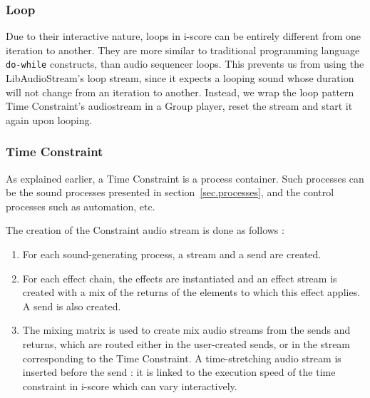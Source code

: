 \documentclass{article}
\begin{document}
\subsubsection{Loop}
Due to their interactive nature, loops in i-score can be entirely different from 
one iteration to another. 
They are more similar to traditional programming language \texttt{do-while} constructs, than audio sequencer loops.
This prevents us from using the LibAudioStream's loop stream, since 
it expects a looping sound whose duration will not change from an iteration to another.
Instead, we wrap the loop pattern Time Constraint's audiostream in a Group player, reset the stream and start it again upon looping.

\subsubsection{Time Constraint}
As explained earlier, a Time Constraint is a process container.
Such processes can be the sound processes presented in section~\ref{sec.processes}, and 
the control processes such as automation, etc.

The creation of the Constraint audio stream is done as follows : 
\begin{enumerate}
    \item For each sound-generating process, a stream and a send are created.
    \item For each effect chain, the effects are instantiated and an effect stream is created with a mix of the returns of the elements to which this effect applies.
    A send is also created.
    \item The mixing matrix is used to create mix audio streams from the sends and returns, which are routed either in the user-created sends, or in the stream corresponding to the Time Constraint.
    A time-stretching audio stream is inserted before the send : it is linked to the execution speed of the time constraint in i-score which can vary interactively.
\end{enumerate} 



\end{document}
